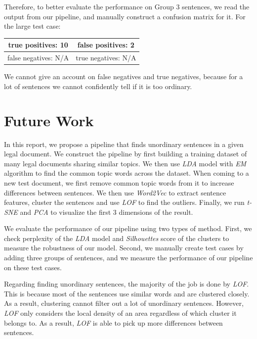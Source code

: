 \documentclass[conference,compsoc]{IEEEtran}
\begin{document}
  Therefore, to better evaluate the performance on Group 3 sentences, we read the output from our pipeline, and manually construct a confusion matrix for it. For the large test case: 

  \begin{center}
    \begin{tabular}{|| c || c ||}
      \hline
         true positives: 10 & false positives: 2 \\ \hline
         false negatives: N/A & true negatives: N/A \\ \hline %
    \end{tabular}
  \end{center}

  We cannot give an account on false negatives and true negatives, because for a lot of sentences we cannot confidently tell if it is too ordinary. 

  \section{Future Work}
  In this report, we propose a pipeline that finds unordinary sentences in a given legal document. We construct the pipeline by first building a training dataset of many legal documents sharing similar topics. We then use \emph{LDA} model with \emph{EM} algorithm to find the common topic words across the dataset. When coming to a new test document, we first remove common topic words from it to increase differences between sentences. We then use \emph{Word2Vec} to extract sentence features, cluster the sentences and use \emph{LOF} to find the outliers. Finally, we run \emph{t-SNE} and \emph{PCA} to visualize the first 3 dimensions of the result. 

  We evaluate the performance of our pipeline using two types of method. First, we check perplexity of the \emph{LDA} model and \emph{Silhouettes} score of the clusters to measure the robustness of our model. Second, we manually create test cases by adding three groups of sentences, and we measure the performance of our pipeline on these test cases. 

  Regarding finding unordinary sentences, the majority of the job is done by \emph{LOF}. This is because most of the sentences use similar words and are clustered closely. As a result, clustering cannot filter out a lot of unordinary sentences. However, \emph{LOF} only considers the local density of an area regardless of which cluster it belongs to. As a result, \emph{LOF} is able to pick up more differences between sentences. 
\end{document}
